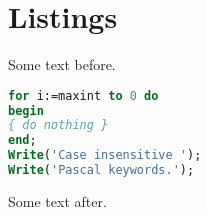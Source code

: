 \documentclass{article}
\begin{document}
  \section{Listings}
  Some text before.
  \begin{lstlisting}[language=Pascal]
for i:=maxint to 0 do
begin
{ do nothing }
end;
Write('Case insensitive ');
Write('Pascal keywords.');
  \end{lstlisting}
  Some text after.
\end{document}
